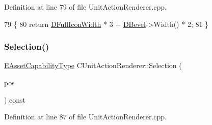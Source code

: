 Definition at line 79 of file Unit\+Action\+Renderer.\+cpp.


\begin{DoxyCode}
79                                            \{
80     \textcolor{keywordflow}{return} \hyperlink{classCUnitActionRenderer_a67e5c1650ef8f849c05d9f059d12fb95}{DFullIconWidth} * 3 + \hyperlink{classCUnitActionRenderer_a3f4012557f7f4d71cfa02df725984ebb}{DBevel}->Width() * 2;
81 \}
\end{DoxyCode}
\hypertarget{classCUnitActionRenderer_a41108fd092035a22f7ecd75b18f045a7}{}\label{classCUnitActionRenderer_a41108fd092035a22f7ecd75b18f045a7} 
\subsubsection{\texorpdfstring{Selection()}{Selection()}}
{\footnotesize\ttfamily \hyperlink{GameDataTypes_8h_a35b98ce26aca678b03c6f9f76e4778ce}{E\+Asset\+Capability\+Type} C\+Unit\+Action\+Renderer\+::\+Selection (\begin{DoxyParamCaption}\item[{const \hyperlink{classCPosition}{C\+Position} \&}]{pos }\end{DoxyParamCaption}) const}



Definition at line 87 of file Unit\+Action\+Renderer.\+cpp.


